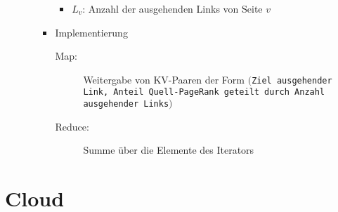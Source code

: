 \begin{itemize}
\begin{itemize}
\begin{itemize}
\begin{itemize}
				\item \(L_v\): Anzahl der ausgehenden Links von Seite \(v\)
			\end{itemize}
			\item Implementierung
			\begin{description}
				\item[Map:] Weitergabe von KV-Paaren der Form \texttt{\(\big(\)Ziel ausgehender Link, Anteil Quell-PageRank geteilt durch Anzahl ausgehender Links\(\big)\)}
				\item[Reduce:] Summe über die Elemente des Iterators
			\end{description}
		\end{itemize}
	\end{itemize}
\end{itemize}



\section{Cloud}

